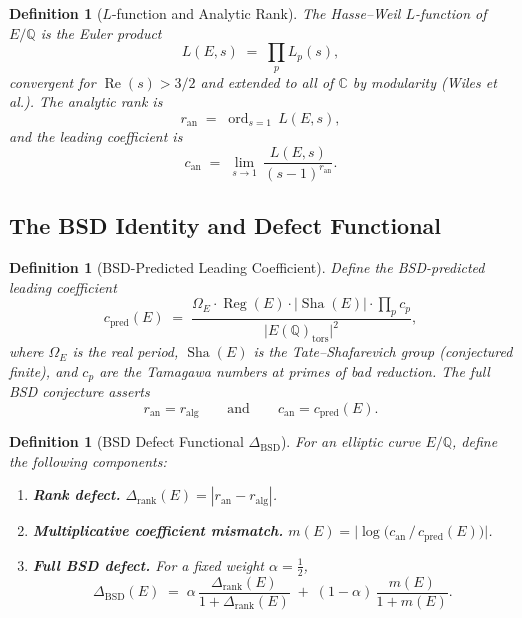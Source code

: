 \documentclass[11pt]{article}
\newtheorem{definition}[theorem]{Definition}
\DeclareMathOperator{\ord}{ord}
\DeclareMathOperator{\Reg}{Reg}
\DeclareMathOperator{\Sha}{Sha}
\begin{document}
\begin{definition}[$L$-function and Analytic Rank]
\label{def:L-func}
The Hasse--Weil $L$-function of $E/\mathbb{Q}$ is the Euler product
\[
  L(E, s) \;=\; \prod_{p} L_p(s),
\]
convergent for $\operatorname{Re}(s) > 3/2$ and extended to all of $\mathbb{C}$
by modularity (Wiles et al.).  The \emph{analytic rank} is
\[
  r_{\mathrm{an}} \;=\; \ord_{s=1}\, L(E, s),
\]
and the \emph{leading coefficient} is
\[
  c_{\mathrm{an}} \;=\; \lim_{s \to 1}\,
    \frac{L(E, s)}{(s - 1)^{r_{\mathrm{an}}}}.
\]
\end{definition}

\subsection{The BSD Identity and Defect Functional}

\begin{definition}[BSD-Predicted Leading Coefficient]
\label{def:bsd-pred}
Define the \emph{BSD-predicted leading coefficient}
\[
  c_{\mathrm{pred}}(E) \;=\;
    \frac{\Omega_E \cdot \Reg(E) \cdot |\Sha(E)| \cdot \displaystyle\prod_p c_p}
         {\bigl|E(\mathbb{Q})_{\mathrm{tors}}\bigr|^2},
\]
where $\Omega_E$ is the real period, $\Sha(E)$ is the Tate--Shafarevich group
(conjectured finite), and $c_p$ are the Tamagawa numbers at primes of bad
reduction.  The full BSD conjecture asserts
\[
  r_{\mathrm{an}} = r_{\mathrm{alg}}
  \qquad\text{and}\qquad
  c_{\mathrm{an}} = c_{\mathrm{pred}}(E).
\]
\end{definition}

\begin{definition}[BSD Defect Functional $\Delta_{\mathrm{BSD}}$]
\label{def:bsd-defect}
For an elliptic curve $E/\mathbb{Q}$, define the following components:
\begin{enumerate}
\item \textbf{Rank defect.}\quad
  $\Delta_{\mathrm{rank}}(E) = |r_{\mathrm{an}} - r_{\mathrm{alg}}|$.
\item \textbf{Multiplicative coefficient mismatch.}\quad
  $m(E) = \bigl|\!\log\!\bigl(c_{\mathrm{an}} \,/\, c_{\mathrm{pred}}(E)\bigr)\bigr|$.
\item \textbf{Full BSD defect.}\quad
  For a fixed weight $\alpha = \tfrac{1}{2}$,
  \[
    \Delta_{\mathrm{BSD}}(E)
    \;=\;
    \alpha\,\frac{\Delta_{\mathrm{rank}}(E)}{1 + \Delta_{\mathrm{rank}}(E)}
    \;+\;
    (1 - \alpha)\,\frac{m(E)}{1 + m(E)}.
  \]
\end{enumerate}
\end{definition}
\end{document}
